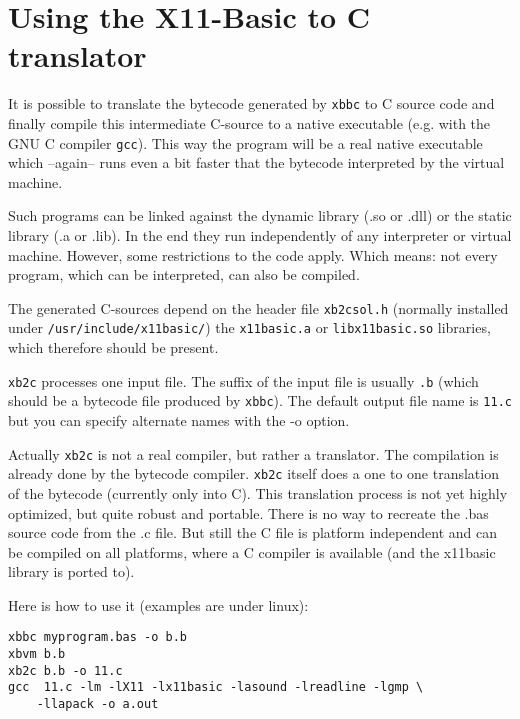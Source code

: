 \section{Using the X11-Basic to C translator}

It is possible to translate the bytecode generated by \verb|xbbc| to C source
code and finally compile this intermediate C-source to a native executable
(e.g. with the GNU C compiler \verb|gcc|). This way the program will be a real
native executable which  --again-- runs even a bit faster  that the bytecode
interpreted by the virtual machine. 

Such programs can be linked against the dynamic library (.so or .dll) or the
static library (.a or .lib). In the end they run independently of any
interpreter or virtual machine.   However, some restrictions to the code apply.
Which means: not every program, which can be interpreted, can also be compiled.

The generated C-sources depend on the header file \verb|xb2csol.h| (normally 
installed under \verb|/usr/include/x11basic/|) the \verb|x11basic.a|  or 
\verb|libx11basic.so| libraries, which therefore should be present.  

\verb|xb2c| processes one input file. The suffix of the input file is  usually
\verb|.b| (which should be a bytecode file produced by \verb|xbbc|). The default
output file name is \verb|11.c| but you can specify alternate names with the -o
option.

Actually \verb|xb2c| is not a real compiler, but rather a translator.  The
compilation is already done by the bytecode compiler. \verb|xb2c| itself does a
one to one translation of the bytecode (currently only into C).  This
translation process is not yet highly optimized, but quite robust and portable.
There is no way to recreate the .bas source code from the .c file.  But still
the C file is platform independent and can be compiled on all platforms, where a
C compiler is available (and the x11basic library is ported to).

Here is how to use it (examples are under linux):

\begin{mdframed}[hidealllines=true,backgroundcolor=black!20]
\begin{verbatim}
xbbc myprogram.bas -o b.b
xbvm b.b
xb2c b.b -o 11.c
gcc  11.c -lm -lX11 -lx11basic -lasound -lreadline -lgmp \
    -llapack -o a.out 
\end{verbatim}
\end{mdframed}

